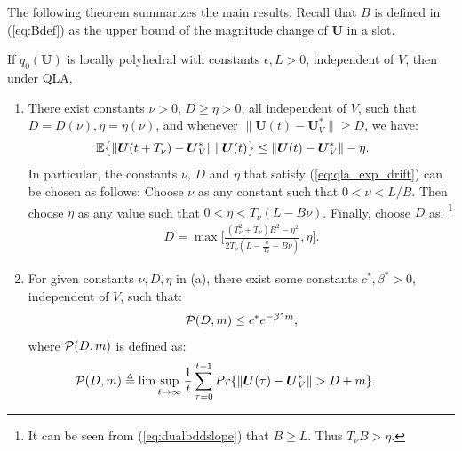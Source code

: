\documentclass[journal]{IEEEtran}
\newcommand{\prob}{Pr}
\newcommand{\expect}[1]{\mathbb{E}\big\{#1\big\}}
\newcommand{\bv}[1]{{\boldsymbol{#1} }}
\newcommand{\script}[1]{{{\cal{#1} }}}
\begin{document}
The following theorem summarizes the main results. Recall that $B$ is defined in (\ref{eq:Bdef}) as the upper bound of the magnitude change of $\bv{U}$ in a slot.
\begin{thm}\label{theorem:prob_multicon_polyhedral}
If $q_0(\bv{U})$ is locally polyhedral with constants $\epsilon, L>0$, independent of $V$, then under QLA, 
\begin{enumerate}
\item[(a)] There exist constants $\nu>0$, $D\geq\eta>0$, all independent of $V$, such that $D=D(\nu), \eta=\eta(\nu)$, and whenever $\|\bv{U}(t)-\bv{U}_V^*\|\geq D$, we have:
\begin{eqnarray}
\hspace{-.2in}\expect{\|\bv{U}(t+T_{\nu})-\bv{U}^*_V\|\left|\right.\bv{U}(t)}\leq \|\bv{U}(t)-\bv{U}_V^*\|-\eta.\label{eq:qla_exp_drift}
\end{eqnarray}
In particular, the constants $\nu$, $D$ and $\eta$ that satisfy (\ref{eq:qla_exp_drift}) can be chosen as follows: Choose $\nu$ as any constant such that $0<\nu<L/B$. Then choose $\eta$ as any value such that $0<\eta< T_{\nu}(L-B\nu)$. Finally, choose $D$ as: \footnote{It can be seen from (\ref{eq:dualbddslope}) that $B\geq L$. Thus $T_{\nu}B>\eta$. }%
\begin{eqnarray}
D= \max\bigg[\frac{(T^2_{\nu}+T_{\nu})B^2-\eta^2}{2T_{\nu}(L-\frac{\eta}{T_{\nu}}-B\nu)}, \eta\bigg].\label{eq:qla_Dvalue}
\end{eqnarray}
\item[(b)] For given constants $\nu, D,\eta$ in (a), there exist some constants $c^*, \beta^*>0$, independent of $V$, such that:
\begin{eqnarray}
\script{P}(D, m)\leq c^*e^{-\beta^*m},\label{eq:pm_ineq}
\end{eqnarray}
where $\script{P}(D, m)$ is defined as:
\begin{eqnarray}
\hspace{-.35in}\script{P}(D, m)\triangleq\lim\sup_{t\rightarrow\infty}\frac{1}{t}\sum_{\tau=0}^{t-1}\prob\{\|\bv{U}(\tau)-\bv{U}_V^*\|>D+m\}. \label{eq:pm_def}
\end{eqnarray}
\end{enumerate}
\end{thm}
 
\end{document}
